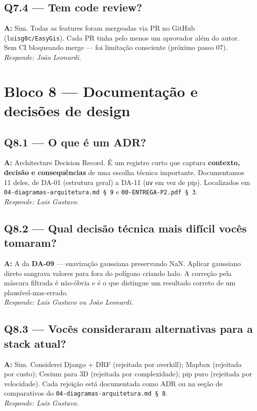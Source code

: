 \documentclass[12pt,a4paper]{article}
\begin{document}
\subsection*{Q7.4 — Tem code review?}
\textbf{A:} Sim. Todas as features foram mergeadas via PR no GitHub
(\texttt{luisg0c/EasyGis}). Cada PR tinha pelo menos um aprovador além do
autor. Sem CI bloqueando merge — foi limitação consciente
(próximo passo 07).
\\[2pt] \textit{Responde: João Leonardi.}

\section*{Bloco 8 — Documentação e decisões de design}

\subsection*{Q8.1 — O que é um ADR?}
\textbf{A:} Architecture Decision Record. É um registro curto que captura
\textbf{contexto, decisão e consequências} de uma escolha técnica
importante. Documentamos 11 deles, de DA-01 (estrutura geral) a DA-11
(\texttt{uv} em vez de pip). Localizados em
\texttt{04-diagramas-arquitetura.md §\,9} e \texttt{00-ENTREGA-P2.pdf §\,3}.
\\[2pt] \textit{Responde: Luis Gustavo.}

\subsection*{Q8.2 — Qual decisão técnica mais difícil vocês tomaram?}
\textbf{A:} A da \textbf{DA-09} — suavização gaussiana preservando NaN.
Aplicar gaussiano direto sangrava valores para fora do polígono criando
halo. A correção pela máscara filtrada é não-óbvia e é o que distingue um
resultado correto de um plausível-mas-errado.
\\[2pt] \textit{Responde: Luis Gustavo ou João Leonardi.}

\subsection*{Q8.3 — Vocês consideraram alternativas para a stack atual?}
\textbf{A:} Sim. Considerei Django + DRF (rejeitada por overkill); Mapbox
(rejeitada por custo); Cesium para 3D (rejeitada por complexidade);
pip puro (rejeitada por velocidade). Cada rejeição está documentada como
ADR ou na seção de comparativos do \texttt{04-diagramas-arquitetura.md §\,8}.
\\[2pt] \textit{Responde: Luis Gustavo.}
\end{document}
